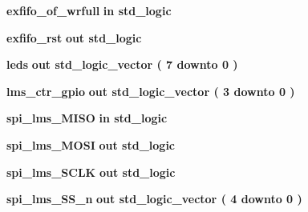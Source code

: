 \begin{DoxyCompactItemize}
\item 
{\bf exfifo\+\_\+of\+\_\+wrfull}  {\bfseries {\bfseries \textcolor{keywordflow}{in}\textcolor{vhdlchar}{ }}} {\bfseries \textcolor{comment}{std\+\_\+logic}\textcolor{vhdlchar}{ }} 
\item 
{\bf exfifo\+\_\+rst}  {\bfseries {\bfseries \textcolor{keywordflow}{out}\textcolor{vhdlchar}{ }}} {\bfseries \textcolor{comment}{std\+\_\+logic}\textcolor{vhdlchar}{ }} 
\item 
{\bf leds}  {\bfseries {\bfseries \textcolor{keywordflow}{out}\textcolor{vhdlchar}{ }}} {\bfseries \textcolor{comment}{std\+\_\+logic\+\_\+vector}\textcolor{vhdlchar}{ }\textcolor{vhdlchar}{(}\textcolor{vhdlchar}{ }\textcolor{vhdlchar}{ } \textcolor{vhdldigit}{7} \textcolor{vhdlchar}{ }\textcolor{keywordflow}{downto}\textcolor{vhdlchar}{ }\textcolor{vhdlchar}{ } \textcolor{vhdldigit}{0} \textcolor{vhdlchar}{ }\textcolor{vhdlchar}{)}\textcolor{vhdlchar}{ }} 
\item 
{\bf lms\+\_\+ctr\+\_\+gpio}  {\bfseries {\bfseries \textcolor{keywordflow}{out}\textcolor{vhdlchar}{ }}} {\bfseries \textcolor{comment}{std\+\_\+logic\+\_\+vector}\textcolor{vhdlchar}{ }\textcolor{vhdlchar}{(}\textcolor{vhdlchar}{ }\textcolor{vhdlchar}{ } \textcolor{vhdldigit}{3} \textcolor{vhdlchar}{ }\textcolor{keywordflow}{downto}\textcolor{vhdlchar}{ }\textcolor{vhdlchar}{ } \textcolor{vhdldigit}{0} \textcolor{vhdlchar}{ }\textcolor{vhdlchar}{)}\textcolor{vhdlchar}{ }} 
\item 
{\bf spi\+\_\+lms\+\_\+\+M\+I\+SO}  {\bfseries {\bfseries \textcolor{keywordflow}{in}\textcolor{vhdlchar}{ }}} {\bfseries \textcolor{comment}{std\+\_\+logic}\textcolor{vhdlchar}{ }} 
\item 
{\bf spi\+\_\+lms\+\_\+\+M\+O\+SI}  {\bfseries {\bfseries \textcolor{keywordflow}{out}\textcolor{vhdlchar}{ }}} {\bfseries \textcolor{comment}{std\+\_\+logic}\textcolor{vhdlchar}{ }} 
\item 
{\bf spi\+\_\+lms\+\_\+\+S\+C\+LK}  {\bfseries {\bfseries \textcolor{keywordflow}{out}\textcolor{vhdlchar}{ }}} {\bfseries \textcolor{comment}{std\+\_\+logic}\textcolor{vhdlchar}{ }} 
\item 
{\bf spi\+\_\+lms\+\_\+\+S\+S\+\_\+n}  {\bfseries {\bfseries \textcolor{keywordflow}{out}\textcolor{vhdlchar}{ }}} {\bfseries \textcolor{comment}{std\+\_\+logic\+\_\+vector}\textcolor{vhdlchar}{ }\textcolor{vhdlchar}{(}\textcolor{vhdlchar}{ }\textcolor{vhdlchar}{ } \textcolor{vhdldigit}{4} \textcolor{vhdlchar}{ }\textcolor{keywordflow}{downto}\textcolor{vhdlchar}{ }\textcolor{vhdlchar}{ } \textcolor{vhdldigit}{0} \textcolor{vhdlchar}{ }\textcolor{vhdlchar}{)}\textcolor{vhdlchar}{ }} 

\end{DoxyCompactItemize}
